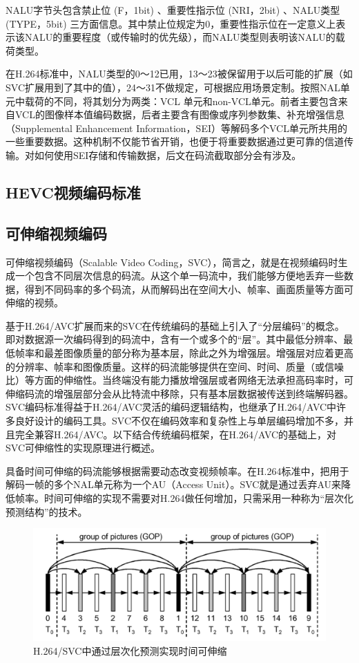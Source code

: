NALU字节头包含禁止位 (F，1bit) 、重要性指示位 (NRI，2bit) 、NALU类型 (TYPE，5bit) 三方面信息。其中禁止位规定为0，重要性指示位在一定意义上表示该NALU的重要程度（或传输时的优先级），而NALU类型则表明该NALU的载荷类型。

在H.264标准中，NALU类型的0～12已用，13～23被保留用于以后可能的扩展（如SVC扩展用到了其中的值），24～31不做规定，可根据应用场景定制。按照NAL单元中载荷的不同，将其划分为两类：VCL 单元和non-VCL单元。前者主要包含来自VCL的图像样本值编码数据，后者主要含有图像或序列参数集、补充增强信息（Supplemental Enhancement Information，SEI）等解码多个VCL单元所共用的一些重要数据。这种机制不仅能节省开销，也便于将重要数据通过更可靠的信道传输。对如何使用SEI存储和传输数据，后文在码流截取部分会有涉及。

\subsection{HEVC视频编码标准}

\subsection{可伸缩视频编码}

可伸缩视频编码（Scalable Video Coding，SVC），简言之，就是在视频编码时生成一个包含不同层次信息的码流。从这个单一码流中，我们能够方便地丢弃一些数据，得到不同码率的多个码流，从而解码出在空间大小、帧率、画面质量等方面可伸缩的视频。

基于H.264/AVC扩展而来的SVC在传统编码的基础上引入了“分层编码”的概念。即对数据源一次编码得到的码流中，含有一个或多个的“层”。其中最低分辨率、最低帧率和最差图像质量的部分称为基本层，除此之外为增强层。增强层对应着更高的分辨率、帧率和图像质量。这样的码流能够提供在空间、时间、质量（或信噪比）等方面的伸缩性。当终端没有能力播放增强层或者网络无法承担高码率时，可伸缩码流的增强层部分会从比特流中移除，只有基本层数据被传送到终端解码器。SVC编码标准得益于H.264/AVC灵活的编码逻辑结构，也继承了H.264/AVC中许多良好设计的编码工具。SVC不仅在编码效率和复杂性上与单层编码增加不多\supercite{SVC-Performance}，并且完全兼容H.264/AVC。以下结合传统编码框架，在H.264/AVC的基础上，对SVC可伸缩性的实现原理进行概述。

具备时间可伸缩的码流能够根据需要动态改变视频帧率。在H.264标准中，把用于解码一帧的多个NAL单元称为一个AU（Access Unit）。SVC就是通过丢弃AU来降低帧率。时间可伸缩的实现不需要对H.264做任何增加，只需采用一种称为“层次化预测结构”的技术。

\begin{figure}[h]
	\centering
	\includegraphics[width = 1.0\linewidth]{clip/04.png}
	\caption{H.264/SVC中通过层次化预测实现时间可伸缩\label{fig:04}}
\end{figure}

